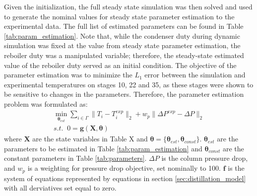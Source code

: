Given the initialization, the full steady state simulation was then solved and used to generate the nominal values for steady state parameter estimation to the experimental data. The full list of estimated parameters can be found in Table \ref{tab:param_estimation}. Note that, while the condenser duty during dynamic simulation was fixed at the value from steady state parameter estimation, the reboiler duty was a manipulated variable; therefore, the steady-state estimated value of the reboiler duty served as an initial condition. The objective of the parameter estimation was to minimize the $L_1$ error between the simulation and experimental temperatures on stages 10, 22 and 35, as these stages were shown to be sensitive to changes in the parameters. Therefore, the parameter estimation problem was formulated as:
\begin{subequations}
    \begin{align}
        \min_{\boldsymbol \theta_{est}} \sum_{i \in \Gamma} \lVert T_i-T_i^{exp}\rVert_2 + w_p \lVert \Delta P^{exp} - \Delta P \rVert_2 \\
        s.t. \;\; 0 = \mathbf g(\mathbf X, \boldsymbol \theta)
    \end{align}
\end{subequations}
where $\mathbf X$ are the state variables in Table X  and $\boldsymbol \theta = \{\boldsymbol \theta_{est}, \boldsymbol \theta_{const} \}$.  $\boldsymbol \theta_{est}$ are the parameters to be estimated in Table \ref{tab:param_estimation} and $\boldsymbol \theta_{const}$ are the constant parameters in Table \ref{tab:parameters}. $\Delta P$ is the column pressure drop, and $w_p$ is a weighting for pressure drop objective, set nominally to 100.  $\mathbf f$ is the system of equations represented by equations in section \ref{sec:distillation_model} with all derviatives set equal to zero. 
